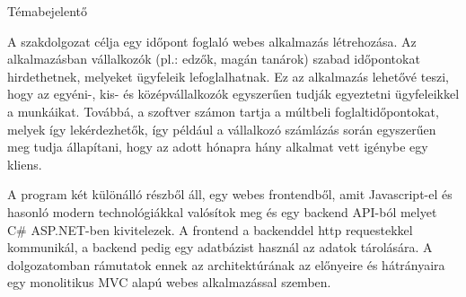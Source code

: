 {\Huge{Témabejelentő}}

A szakdolgozat célja egy időpont foglaló webes alkalmazás létrehozása. Az alkalmazásban vállalkozók (pl.: edzők, magán tanárok) szabad időpontokat hirdethetnek, melyeket ügyfeleik lefoglalhatnak. Ez az alkalmazás lehetővé teszi, hogy az egyéni-, kis- és középvállalkozók egyszerűen tudják egyeztetni ügyfeleikkel a munkáikat. Továbbá, a szoftver számon tartja a múltbeli foglaltidőpontokat, melyek így lekérdezhetők, így például a vállalkozó számlázás során egyszerűen meg tudja állapítani, hogy az adott hónapra hány alkalmat vett igénybe egy kliens.

A program két különálló részből áll, egy webes frontendből, amit Javascript-el és hasonló modern technológiákkal valósítok meg és egy backend API-ból melyet C\# ASP.NET-ben kivitelezek. A frontend a backenddel http requestekkel kommunikál, a backend pedig egy adatbázist használ az adatok tárolására. A dolgozatomban rámutatok ennek az architektúrának az előnyeire és hátrányaira egy monolitikus MVC alapú webes alkalmazással szemben.
